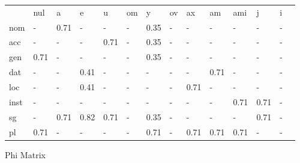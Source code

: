 \documentclass{article}
\begin{document}
\begin{tabular}{llllllllllllll}\toprule
                  &nul     &a       &e       &u       &om      &y       &ov      &ax      &am      &ami     &j       &i       \\ 
nom            &    -   &  0.71  &    -   &    -   &    -   &  0.35  &    -   &    -   &    -   &    -   &    -   &    -   \\ 
acc            &    -   &    -   &    -   &  0.71  &    -   &  0.35  &    -   &    -   &    -   &    -   &    -   &    -   \\ 
gen            &  0.71  &    -   &    -   &    -   &    -   &  0.35  &    -   &    -   &    -   &    -   &    -   &    -   \\ 
dat            &    -   &    -   &  0.41  &    -   &    -   &    -   &    -   &    -   &  0.71  &    -   &    -   &    -   \\ 
loc            &    -   &    -   &  0.41  &    -   &    -   &    -   &    -   &  0.71  &    -   &    -   &    -   &    -   \\ 
inst           &    -   &    -   &    -   &    -   &    -   &    -   &    -   &    -   &    -   &  0.71  &  0.71  &    -   \\ 
sg             &    -   &  0.71  &  0.82  &  0.71  &    -   &  0.35  &    -   &    -   &    -   &    -   &  0.71  &    -   \\ 
pl             &  0.71  &    -   &    -   &    -   &    -   &  0.71  &    -   &  0.71  &  0.71  &  0.71  &    -   &    -   \\ 
\end{tabular}

 \vspace{0.2in}
 


Phi Matrix 
\end{document}
